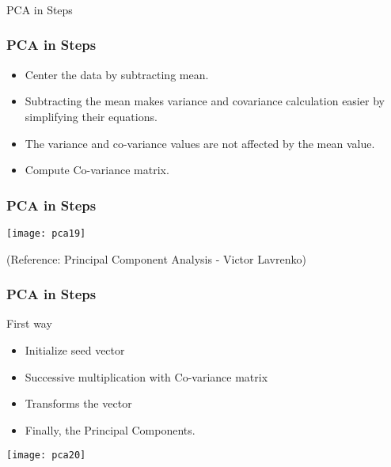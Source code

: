 
\begin{frame}[fragile]\frametitle{}
\begin{center}
{\Large PCA in Steps}
\end{center}
\end{frame}

\begin{frame}[fragile] \frametitle{PCA in Steps} 
\begin{itemize}
\item Center the data by subtracting mean.
\item Subtracting the mean makes variance and covariance 
calculation easier by simplifying their equations. 
\item The 
variance and co-variance values are not affected by 
the mean value.
\item Compute Co-variance matrix.
\end{itemize}
\end{frame}


\begin{frame}[fragile] \frametitle{PCA in Steps} 
\begin{center}
\texttt{[image: pca19]}
\end{center}
\tiny{(Reference: Principal Component Analysis - Victor Lavrenko)}
\end{frame}

\begin{frame}[fragile] \frametitle{PCA in Steps} 
First way
\begin{itemize}
\item Initialize seed vector
\item Successive multiplication with Co-variance matrix
\item Transforms the vector 
\item Finally, the Principal Components.
\end{itemize}
\begin{center}
\texttt{[image: pca20]}
\end{center}
\end{frame}


